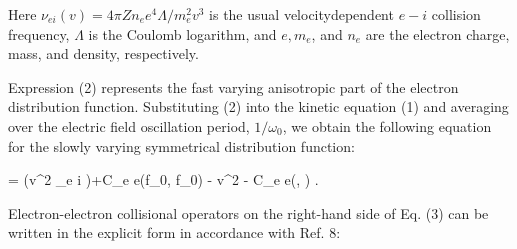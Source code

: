 \documentclass[oneside,onecolumn]{article}
\begin{document}
\begin{sloppypar}
 Here $\nu_{e i}(v)=4 \pi Z n_{e} e^{4} \Lambda / m_{e}^{2} v^{3}$ is the usual velocitydependent $e-i$ collision frequency, $\Lambda$ is the Coulomb logarithm, and $e, m_{e}$, and $n_{e}$ are the electron charge, mass, and density, respectively.
 
 Expression (2) represents the fast varying anisotropic part of the electron distribution function. Substituting (2) into the kinetic equation (1) and averaging over the electric field oscillation period, $1 / \omega_{0}$, we obtain the following equation for the slowly varying symmetrical distribution function:
 
 =   \left(v^{2} \nu_{e i} \right)+C_{e e}\left(f_{0}, f_{0}\right)
 -  v^{2}%
 - C_{e e}\left(, \right) .
 
 Electron-electron collisional operators on the right-hand side of Eq. (3) can be written in the explicit form in accordance with Ref. 8:
 

\end{sloppypar}
\end{document}

